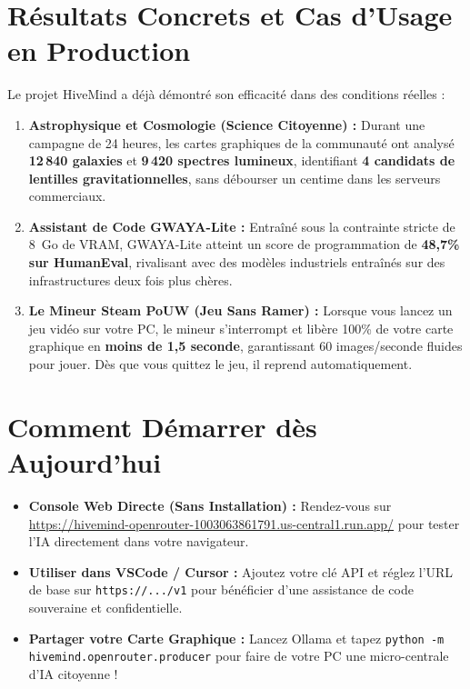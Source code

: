 \documentclass[11pt,a4paper]{report}
\begin{document}
\section{Résultats Concrets et Cas d'Usage en Production}

Le projet HiveMind a déjà démontré son efficacité dans des conditions réelles :
\begin{enumerate}[leftmargin=1.8em]
    \item \textbf{Astrophysique et Cosmologie (Science Citoyenne) :} Durant une campagne de 24 heures, les cartes graphiques de la communauté ont analysé \textbf{12\,840 galaxies} et \textbf{9\,420 spectres lumineux}, identifiant \textbf{4 candidats de lentilles gravitationnelles}, sans débourser un centime dans les serveurs commerciaux.
    \item \textbf{Assistant de Code GWAYA-Lite :} Entraîné sous la contrainte stricte de 8~Go de VRAM, GWAYA-Lite atteint un score de programmation de \textbf{48,7\% sur HumanEval}, rivalisant avec des modèles industriels entraînés sur des infrastructures deux fois plus chères.
    \item \textbf{Le Mineur Steam PoUW (Jeu Sans Ramer) :} Lorsque vous lancez un jeu vidéo sur votre PC, le mineur s'interrompt et libère 100\% de votre carte graphique en \textbf{moins de 1,5 seconde}, garantissant 60 images/seconde fluides pour jouer. Dès que vous quittez le jeu, il reprend automatiquement.
\end{enumerate}

\section{Comment Démarrer dès Aujourd'hui}
\begin{itemize}[leftmargin=1.8em]
    \item \textbf{Console Web Directe (Sans Installation) :} Rendez-vous sur \url{https://hivemind-openrouter-1003063861791.us-central1.run.app/} pour tester l'IA directement dans votre navigateur.
    \item \textbf{Utiliser dans VSCode / Cursor :} Ajoutez votre clé API et réglez l'URL de base sur \texttt{https://.../v1} pour bénéficier d'une assistance de code souveraine et confidentielle.
    \item \textbf{Partager votre Carte Graphique :} Lancez Ollama et tapez \texttt{python -m hivemind.openrouter.producer} pour faire de votre PC une micro-centrale d'IA citoyenne !
\end{itemize}
\end{document}
